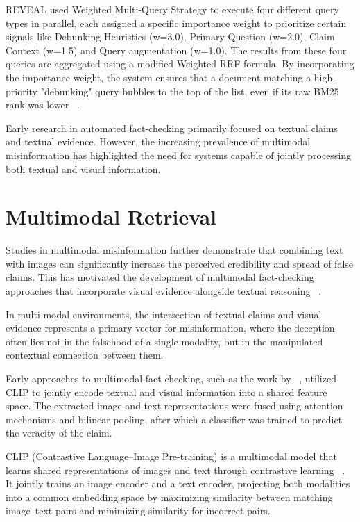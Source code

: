 REVEAL used Weighted Multi-Query Strategy to execute four different query types in parallel, each assigned a specific importance weight to prioritize certain signals like Debunking Heuristics (w=3.0), Primary Question (w=2.0), Claim Context (w=1.5) and Query augmentation (w=1.0). The results from these four queries are aggregated using a modified Weighted RRF formula. By incorporating the importance weight, the system ensures that a document matching a high-priority "debunking" query bubbles to the top of the list, even if its raw BM25 rank was lower ~\cite{Tariq2026Mar}.

Early research in automated fact-checking primarily focused on textual claims and textual evidence. However, the increasing prevalence of multimodal misinformation has highlighted the need for systems capable of jointly processing both textual and visual information.

\section{Multimodal Retrieval}

Studies in multimodal misinformation further demonstrate that combining text with images can significantly increase the perceived credibility and spread of false claims. This has motivated the development of multimodal fact-checking approaches that incorporate visual evidence alongside textual reasoning ~\cite{Hameleers2020Feb}.

In multi-modal environments, the intersection of textual claims and visual evidence represents a primary vector for misinformation, where the deception often lies not in the falsehood of a single modality, but in the manipulated contextual connection between them.

Early approaches to multimodal fact-checking, such as the work by ~\citet{Xu2024Mar}, utilized CLIP to jointly encode textual and visual information into a shared feature space. The extracted image and text representations were fused using attention mechanisms and bilinear pooling, after which a classifier was trained to predict the veracity of the claim.

CLIP (Contrastive Language–Image Pre-training) is a multimodal model that learns shared representations of images and text through contrastive learning ~\cite{Radford2021Feb}. It jointly trains an image encoder and a text encoder, projecting both modalities into a common embedding space by maximizing similarity between matching image–text pairs and minimizing similarity for incorrect pairs.

